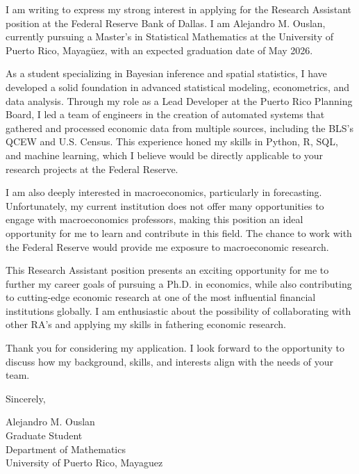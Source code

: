 \documentclass{article}
\begin{document}
I am writing to express my strong interest in applying for the Research Assistant position at the Federal Reserve Bank of Dallas.
I am Alejandro M. Ouslan, currently pursuing a Master’s in Statistical Mathematics at the University of Puerto Rico, Mayagüez, with an expected graduation date of May 2026.

As a student specializing in Bayesian inference and spatial statistics, I have developed a solid foundation in advanced statistical modeling, econometrics, and data analysis.
Through my role as a Lead Developer at the Puerto Rico Planning Board, I led a team of engineers in the creation of automated systems that gathered and processed economic data
from multiple sources, including the BLS’s QCEW and U.S. Census. This experience honed my skills in Python, R, SQL, and machine learning, which I believe would be directly
applicable to your research projects at the Federal Reserve.

I am also deeply interested in macroeconomics, particularly in forecasting. Unfortunately, my current institution does not offer many opportunities to engage with macroeconomics professors,
making this position an ideal opportunity for me to learn and contribute in this field. The chance to work with the Federal Reserve would provide me exposure to macroeconomic
research.

This Research Assistant position presents an exciting opportunity for me to further my career goals of pursuing a Ph.D. in economics, while also contributing to
cutting-edge economic research at one of the most influential financial institutions globally. I am enthusiastic about the possibility of collaborating with
other RA's and applying my skills in fathering economic research.

Thank you for considering my application. I look forward to the opportunity to discuss how my background, skills, and interests align with the needs of your team.

Sincerely,  
\vspace{20pt}  

Alejandro M. Ouslan \\
Graduate Student \\
Department of Mathematics \\
University of Puerto Rico, Mayaguez
\end{document}
